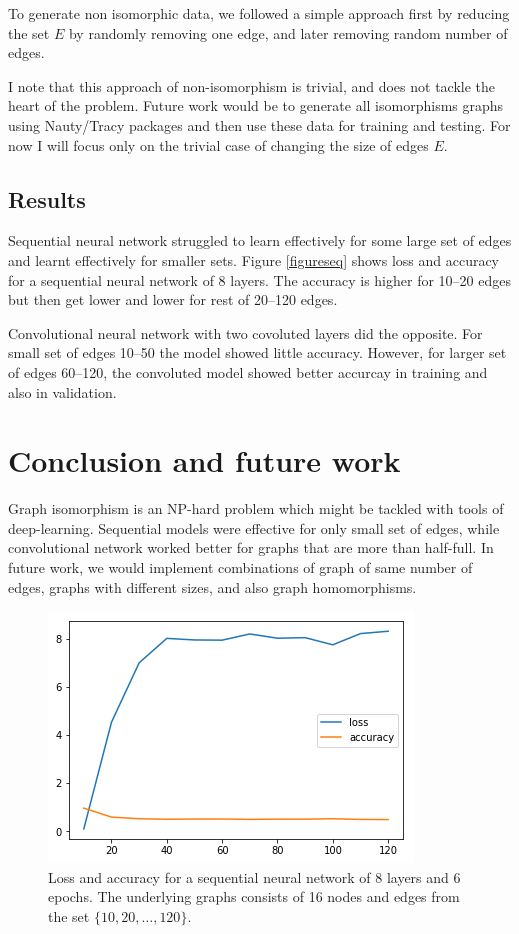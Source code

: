 \documentclass[letterpaper,UKenglish]{lipics-v2018}
\begin{document}

To generate non isomorphic data, we followed a simple approach first by reducing the set $E$ by randomly removing one edge, and later removing random number of edges. 

I note that this approach of non-isomorphism is trivial, and does not tackle the heart of the problem. Future work would be to generate all isomorphisms graphs using Nauty/Tracy packages and then use these data for training and testing. For now I will focus only on the trivial case of changing the size of edges $E$.

\subsection{Results}
Sequential neural network struggled to learn effectively for some large set of edges and learnt effectively for smaller sets. Figure \ref{figureseq} shows loss and accuracy for a sequential neural network of 8 layers. The accuracy is higher for 10--20 edges but then get lower and lower for rest of 20--120 edges.

Convolutional neural network with two covoluted layers did the opposite. For small set of edges 10--50 the model showed little accuracy. However, for larger set of edges 60--120, the convoluted model showed better accurcay in training and also in validation. 

\section{Conclusion and future work}
Graph isomorphism is an NP-hard problem which might be tackled with tools of deep-learning. Sequential models were effective for only small set of edges, while convolutional network worked better for graphs that are more than half-full. In future work, we would implement combinations of graph of same number of edges, graphs with different sizes, and also graph homomorphisms.

\begin{figure}\label{figseq}
\centering
\includegraphics[scale = .5]{pic/8-layers-sequential}
\caption{Loss and accuracy for a sequential neural network of 8 layers and 6 epochs. The underlying graphs consists of 16 nodes and edges from the set $\{10,20, \dots, 120 \}$.}
\end{figure}
\end{document}
